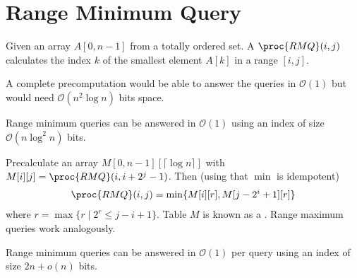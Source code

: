 \section{Range Minimum Query}

\begin{Definition}
  Given an array $A[0,n-1]$ from a totally ordered set. A  $\proc{RMQ}(i,j)$ calculates the index $k$ of the smallest element $A[k]$ in a range $[i,j]$.
\end{Definition}

A complete precomputation would be able to answer the queries in $\mathcal{O}(1)$ but would need $\mathcal{O}(n^2\log n)$ bits space. 

\begin{Theorem}
  Range minimum queries can be answered in $\mathcal{O}(1)$ using an index of size $\mathcal{O}(n\log^2 n)$ bits.
\end{Theorem}

\begin{Proof}
  Precalculate an array $M[0,n-1][\lceil\log n\rceil]$ with $M[i][j] = \proc{RMQ}(i, i + 2^j - 1)$. Then (using that $\min$ is idempotent)
  \begin{align}
    \proc{RMQ}(i, j) = \min \{M[i][r], M[j - 2^i + 1][r]\}
  \end{align}
  where $r = \max \{r \mid 2^r \leq j - i + 1\}$. Table $M$ is known as a . Range maximum queries work analogously.
\end{Proof}

\begin{Theorem}
  Range minimum queries can be answered in $\mathcal{O}(1)$ per query using an index of size $2n + o(n)$ bits.
\end{Theorem}
